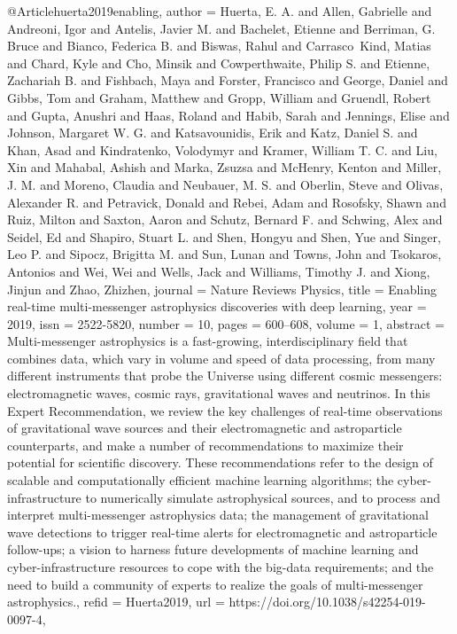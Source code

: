 @Article{huerta2019enabling,
  author   = {Huerta, E. A. and Allen, Gabrielle and Andreoni, Igor and Antelis, Javier M. and Bachelet, Etienne and Berriman, G. Bruce and Bianco, Federica B. and Biswas, Rahul and Carrasco Kind, Matias and Chard, Kyle and Cho, Minsik and Cowperthwaite, Philip S. and Etienne, Zachariah B. and Fishbach, Maya and Forster, Francisco and George, Daniel and Gibbs, Tom and Graham, Matthew and Gropp, William and Gruendl, Robert and Gupta, Anushri and Haas, Roland and Habib, Sarah and Jennings, Elise and Johnson, Margaret W. G. and Katsavounidis, Erik and Katz, Daniel S. and Khan, Asad and Kindratenko, Volodymyr and Kramer, William T. C. and Liu, Xin and Mahabal, Ashish and Marka, Zsuzsa and McHenry, Kenton and Miller, J. M. and Moreno, Claudia and Neubauer, M. S. and Oberlin, Steve and Olivas, Alexander R. and Petravick, Donald and Rebei, Adam and Rosofsky, Shawn and Ruiz, Milton and Saxton, Aaron and Schutz, Bernard F. and Schwing, Alex and Seidel, Ed and Shapiro, Stuart L. and Shen, Hongyu and Shen, Yue and Singer, Leo P. and Sipocz, Brigitta M. and Sun, Lunan and Towns, John and Tsokaros, Antonios and Wei, Wei and Wells, Jack and Williams, Timothy J. and Xiong, Jinjun and Zhao, Zhizhen},
  journal  = {Nature Reviews Physics},
  title    = {Enabling real-time multi-messenger astrophysics discoveries with deep learning},
  year     = {2019},
  issn     = {2522-5820},
  number   = {10},
  pages    = {600--608},
  volume   = {1},
  abstract = {Multi-messenger astrophysics is a fast-growing, interdisciplinary field that combines data, which vary in volume and speed of data processing, from many different instruments that probe the Universe using different cosmic messengers: electromagnetic waves, cosmic rays, gravitational waves and neutrinos. In this Expert Recommendation, we review the key challenges of real-time observations of gravitational wave sources and their electromagnetic and astroparticle counterparts, and make a number of recommendations to maximize their potential for scientific discovery. These recommendations refer to the design of scalable and computationally efficient machine learning algorithms; the cyber-infrastructure to numerically simulate astrophysical sources, and to process and interpret multi-messenger astrophysics data; the management of gravitational wave detections to trigger real-time alerts for electromagnetic and astroparticle follow-ups; a vision to harness future developments of machine learning and cyber-infrastructure resources to cope with the big-data requirements; and the need to build a community of experts to realize the goals of multi-messenger astrophysics.},
  refid    = {Huerta2019},
  url      = {https://doi.org/10.1038/s42254-019-0097-4},
}


